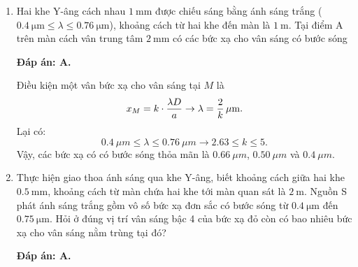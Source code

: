 \begin{enumerate}[label=\bfseries Câu \arabic*:]
{	}
	
	\item {} 
	
	\cauhoi
	{Hai khe Y-âng cách nhau $\SI{1}{\milli \meter}$ được chiếu sáng bằng ánh sáng trắng ($\SI{0.4}{\micro \meter} \leq \lambda \leq \SI{0.76}{\micro \meter}$), khoảng cách từ hai khe đến màn là $\SI{1}{\meter}$. Tại điểm A trên màn cách vân trung tâm $\SI{2}{\milli \meter}$ có các bức xạ cho vân sáng có bước sóng
	}
	
	\loigiai
	{		\textbf{Đáp án: A.}
		
Điều kiện một vân bức xạ cho vân sáng tại $ M $ là
$$
	x_{M} = k \cdot \dfrac{\lambda D}{a} \rightarrow \lambda = \xsi{\dfrac{2}{k}}{\mu m}.
$$
Lại có:
$$
	\SI{0,4}{\mu m} \leq \lambda \leq \SI{0,76}{\mu m} \rightarrow \num{2,63} \leq k \leq \num{5}.
$$
Vậy, các bức xạ có có bước sóng thỏa mãn là $ \SI{0,66}{\mu m} $, $ \SI{0,50}{\mu m} $ và $ \SI{0,4}{\mu m} $.
	}
	
	\item {} 
	
	\cauhoi
	{Thực hiện giao thoa ánh sáng qua khe Y-âng, biết khoảng cách giữa hai khe $\SI{0.5}{\milli \meter}$, khoảng cách từ màn chứa hai khe tới màn quan sát là $\SI{2}{\meter}$. Nguồn S phát ánh sáng trắng gồm vô số bức xạ đơn sắc có bước sóng từ $\SI{0.4}{\micro \meter}$ đến $\SI{0.75}{\micro \meter}$. Hỏi ở đúng vị trí vân sáng bậc 4 của bức xạ đỏ còn có bao nhiêu bức xạ cho vân sáng nằm trùng tại đó?
	}
	
	\loigiai
	{		\textbf{Đáp án: A.}
		
}
\end{enumerate}
